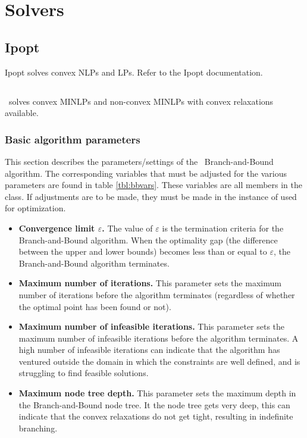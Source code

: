 \section{Solvers}

\subsection{Ipopt}
Ipopt solves convex NLPs and LPs.
Refer to the Ipopt documentation.

\subsection{\solvername}
\solvername\ solves convex MINLPs and non-convex MINLPs with convex relaxations available.
\subsubsection{Basic algorithm parameters}
This section describes the parameters/settings of the \solvername\ Branch-and-Bound algorithm. The corresponding variables that must be adjusted for the various parameters are found in table \ref{tbl:bbvars}. These variables are all members in the  class. If adjustments are to be made, they must be made in the instance of  used for optimization.
\begin{itemize}
\item{\textbf{Convergence limit $\varepsilon$.}} The value of $\varepsilon$ is the termination criteria for the Branch-and-Bound algorithm. When the optimality gap (the difference between the upper and lower bounds) becomes less than or equal to $\varepsilon$, the Branch-and-Bound algorithm terminates.
\item{\textbf{Maximum number of iterations.}} This parameter sets the maximum number of iterations before the algorithm terminates (regardless of whether the optimal point has been found or not).
\item{\textbf{Maximum number of infeasible iterations.}} This parameter sets the maximum number of infeasible iterations before the algorithm terminates. A high number of infeasible iterations can indicate that the algorithm has ventured outside the domain in which the constraints are well defined, and is struggling to find feasible solutions.
\item{\textbf{Maximum node tree depth.}} This parameter sets the maximum depth in the Branch-and-Bound node tree. It the node tree gets very deep, this can indicate that the  convex relaxations do not get tight, resulting in indefinite branching.
\end{itemize}
